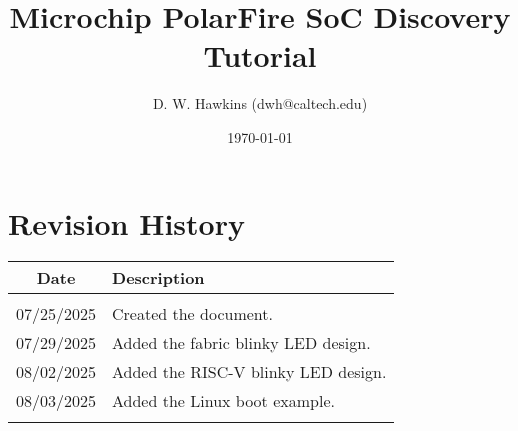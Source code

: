 \documentclass[10pt,twoside]{article}
\begin{document}
\title{Microchip PolarFire SoC Discovery Tutorial}
\author{D. W. Hawkins (dwh@caltech.edu)}
\date{\today}

\maketitle

\tableofcontents

\pagestyle{fancy}

\clearpage

%

\clearpage

\clearpage

\clearpage

\clearpage

\clearpage

\clearpage


\clearpage
\appendix

\clearpage
\section{Revision History}
%
\begin{table}[h]
\begin{center}
\begin{tabular}{|c|p{100mm}|}
\hline
Date & Description\\
\hline\hline
&\\
07/25/2025  & Created the document.\\
07/29/2025  & Added the fabric blinky LED design.\\
08/02/2025  & Added the RISC-V blinky LED design.\\
08/03/2025  & Added the Linux boot example.\\
&\\
\hline
\end{tabular}
\end{center}
\end{table}

%
%



\end{document}
